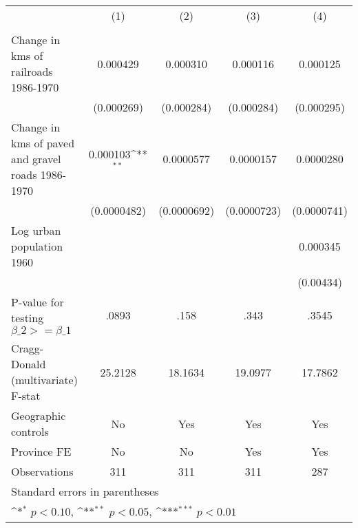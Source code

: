 {
\def\sym#1{\ifmmode^{#1}\else\(^{#1}\)\fi}
\begin{tabular}{l*{4}{c}}
\hline\hline
                &\multicolumn{1}{c}{(1)}&\multicolumn{1}{c}{(2)}&\multicolumn{1}{c}{(3)}&\multicolumn{1}{c}{(4)}\\
                &\multicolumn{1}{c}{}&\multicolumn{1}{c}{}&\multicolumn{1}{c}{}&\multicolumn{1}{c}{}\\
\hline
Change in kms of railroads 1986-1970& 0.000429         & 0.000310         & 0.000116         & 0.000125         \\
                &(0.000269)         &(0.000284)         &(0.000284)         &(0.000295)         \\
[1em]
Change in kms of paved and gravel roads 1986-1970& 0.000103\sym{**} &0.0000577         &0.0000157         &0.0000280         \\
                &(0.0000482)         &(0.0000692)         &(0.0000723)         &(0.0000741)         \\
[1em]
Log urban population 1960&                  &                  &                  & 0.000345         \\
                &                  &                  &                  &(0.00434)         \\
\hline
P-value for testing $\beta\_{2} >= \beta\_{1}$&    .0893         &     .158         &     .343         &    .3545         \\
Cragg-Donald (multivariate) F-stat&  25.2128         &  18.1634         &  19.0977         &  17.7862         \\
Geographic controls&       No         &      Yes         &      Yes         &      Yes         \\
Province FE     &       No         &       No         &      Yes         &      Yes         \\
Observations    &      311         &      311         &      311         &      287         \\
\hline\hline
\multicolumn{5}{l}{\footnotesize Standard errors in parentheses}\\
\multicolumn{5}{l}{\footnotesize \sym{*} \(p<0.10\), \sym{**} \(p<0.05\), \sym{***} \(p<0.01\)}\\
\end{tabular}
}
